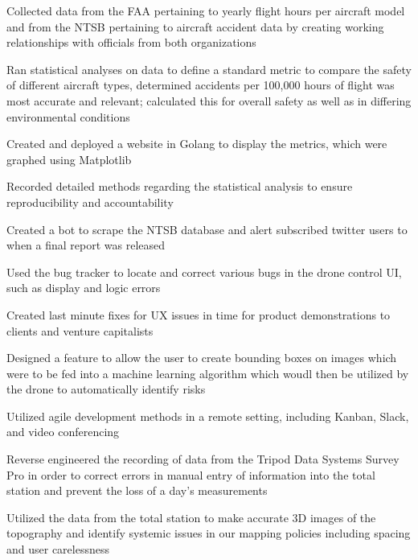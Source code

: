 \documentclass[letterpaper]{resume}
\begin{document}
\begin{compactitem}
\item Collected data from the FAA pertaining to yearly flight hours per aircraft model and from the NTSB pertaining to aircraft accident data by creating working relationships with officials from both organizations
\item Ran statistical analyses on data to define a standard metric to compare the safety of different aircraft types, determined accidents per 100,000 hours of flight was most accurate and relevant; calculated this for overall safety as well as in differing environmental conditions
\item Created and deployed a website in Golang to display the metrics, which were graphed using Matplotlib
\item Recorded detailed methods regarding the statistical analysis to ensure reproducibility and accountability
\item Created a bot to scrape the NTSB database and alert subscribed twitter users to when a final report was released
\end{compactitem}

\begin{compactitem}
\item Used the bug tracker to locate and correct various bugs in the drone control UI, such as display and logic errors
\item Created last minute fixes for UX issues in time for product demonstrations to clients and venture capitalists
\item Designed a feature to allow the user to create bounding boxes on images which were to be fed into a machine learning algorithm which woudl then be utilized by the drone to automatically identify risks
\item Utilized agile development methods in a remote setting, including Kanban, Slack, and video conferencing
\end{compactitem}

\begin{compactitem}
\item Reverse engineered the recording of data from the Tripod Data Systems Survey Pro in order to correct errors in manual entry of information into the total station and prevent the loss of a day's measurements
\item Utilized the data from the total station to make accurate 3D images of the topography and identify systemic issues in our mapping policies including spacing and user carelessness
\end{compactitem}
\end{document}
